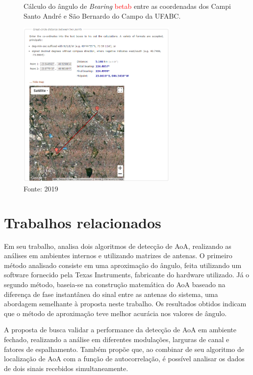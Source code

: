 \begin{figure}[htbp]
    \centering
    \caption{Cálculo do ângulo de \textit{Bearing} \textcolor{Red}{\ac{betab}} entre as coordenadas dos Campi Santo André e São Bernardo do Campo da UFABC.}
    \includegraphics[width=0.7\textwidth]{../pictures/bearing.png}
    \caption*{Fonte: \citeauthor{chrisveness} 2019 \cite{chrisveness}}
    \label{fig:bearing}
\end{figure}

% 

\pagebreak



\section{Trabalhos relacionados}

Em seu trabalho, \citeauthor{horst2021localization} \cite{horst2021localization} analisa dois algoritmos de detecção de \ac{AoA}, realizando as análises em ambientes internos e utilizando matrizes de antenas.
O primeiro método analisado consiste em uma aproximação do ângulo, feita utilizando um software fornecido pela Texas Instruments, fabricante do hardware utilizado.
Já o segundo método, baseia-se na construção matemática do \ac{AoA} baseado na diferença de fase instantânea do sinal entre as antenas do sistema, uma abordagem semelhante à proposta neste trabalho.
Os resultados obtidos indicam que o método de aproximação teve melhor acurácia nos valores de ângulo.

A proposta de \citeauthor{zeaiter:hal-03693641} \cite{zeaiter:hal-03693641} busca validar a performance da detecção de \ac{AoA} em ambiente fechado, realizando a análise em diferentes modulações, larguras de canal e fatores de espalhamento.
Também propõe que, ao combinar de seu algoritmo de localização de \ac{AoA} com a função de autocorrelação, é possível analisar os dados de dois sinais recebidos simultaneamente.

